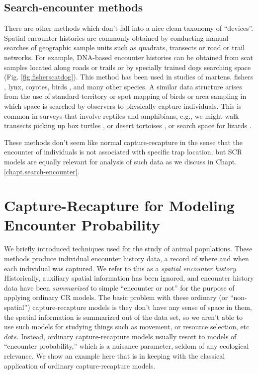 \subsection{Search-encounter methods}

There are other methods which don't fall into a nice clean taxonomy of
``devices''. Spatial encounter histories are commonly obtained by
conducting manual searches of geographic sample units such as
quadrats, transects or road or trail networks.  For example, DNA-based
encounter histories can be obtained from scat samples located along
roads or trails or by specially trained dogs \citep{mackay_etal:2008}
searching space (Fig. \ref{fig.fisherscatdog}). This method has been
used in studies of martens, fishers \citep{thompson_etal:2012},
lynx, coyotes, birds \citep{kery_etal:2010}, and many other species.
A similar data structure arises from the use of standard territory or
spot mapping of birds \cite{bibby_etal:1992} or area sampling in which
space is searched by observers to physically capture individuals.
This is common in surveys that involve reptiles and amphibians, e.g.,
we might walk transects picking up box turtles \citep{hall_etal:1999},
or desert tortoises \citep{zylstra_etal:2010}, or search space for
lizards \citep{royle_young:2008}.

These methods don't seem like normal capture-recapture in the sense
that the encounter of individuals is not associated with specific trap
location, but SCR models are equally relevant for analysis of such
data as we discuss in Chapt. \ref{chapt.search-encounter}.




\section{Capture-Recapture for Modeling Encounter Probability}

We briefly introduced techniques used for the study of animal
populations. These methods produce individual encounter history data,
a record of where and when each individual was captured. We refer to
this as a {\it spatial encounter history}. Historically, auxiliary
spatial information has been ignored, and encounter history data have
been {\it summarized} to simple ``encounter or not'' for the purpose
of applying ordinary CR models.  The basic problem with these ordinary
(or ``non-spatial'') capture-recapture models is they don't have any
sense of space in them, the spatial information is summarized out of
the data set, so we aren't able to use such models for studying things
such as movement, or resource selection, etc$dots$.  Instead, ordinary
capture-recapture models usually resort to models of ``encounter
probability,'' which is a nuisance parameter, seldom of any ecological
relevance.  We show an example here that is in keeping with the
classical application of ordinary capture-recapture models.





